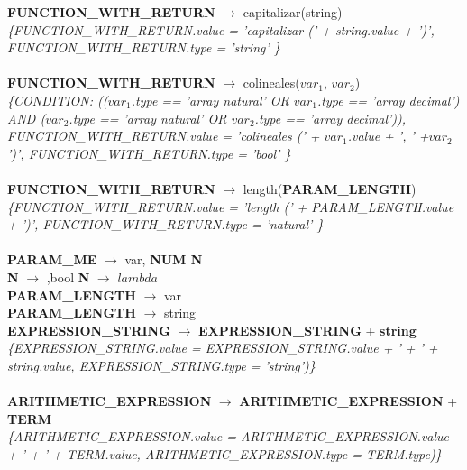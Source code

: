 \documentclass[10pt,a4paper]{article}
\begin{document}
\textbf{FUNCTION\_WITH\_RETURN} $\rightarrow$ capitalizar(string)   \\

\textit{\{FUNCTION\_WITH\_RETURN.value =  'capitalizar (' + string.value + ')', FUNCTION\_WITH\_RETURN.type = 'string' \}}  \\ \\


\textbf{FUNCTION\_WITH\_RETURN} $\rightarrow$ colineales($var_{1}$, $var_{2}$)   \\

\textit{\{CONDITION: (($var_{1}$.type == 'array natural' OR $ var_{1}$.type == 'array decimal') AND
($var_{2}$.type == 'array natural' OR $var_{2}$.type == 'array decimal')), FUNCTION\_WITH\_RETURN.value =  'colineales (' + $var_{1}$.value + ', ' +$var_{2}$')', FUNCTION\_WITH\_RETURN.type = 'bool' \}}  \\ \\


\textbf{FUNCTION\_WITH\_RETURN} $\rightarrow$ length(\textbf{PARAM\_LENGTH}) \\

\textit{\{FUNCTION\_WITH\_RETURN.value =  'length (' + PARAM\_LENGTH.value + ')', FUNCTION\_WITH\_RETURN.type = 'natural' \}}  \\ \\


\textbf{PARAM\_ME} $\rightarrow$ var, \textbf{NUM N} \\
\textbf{N} $\rightarrow$ ,bool 
\textbf{N} $\rightarrow$ $lambda$  \\

\textbf{PARAM\_LENGTH} $\rightarrow$ var \\

\textbf{PARAM\_LENGTH} $\rightarrow$ string \\


\textbf{EXPRESSION\_STRING} $\rightarrow$ \textbf{EXPRESSION\_STRING} + \textbf{string} \\  

\textit{\{EXPRESSION\_STRING.value =  EXPRESSION\_STRING.value + ' + ' + string.value, EXPRESSION\_STRING.type = 'string')\}}  \\ \\


\textbf{ARITHMETIC\_EXPRESSION} $\rightarrow$ \textbf{ARITHMETIC\_EXPRESSION} + \textbf{TERM} \\

\textit{\{ARITHMETIC\_EXPRESSION.value =  ARITHMETIC\_EXPRESSION.value + ' + ' + TERM.value, ARITHMETIC\_EXPRESSION.type = TERM.type)\}}  \\ \\
\end{document}

